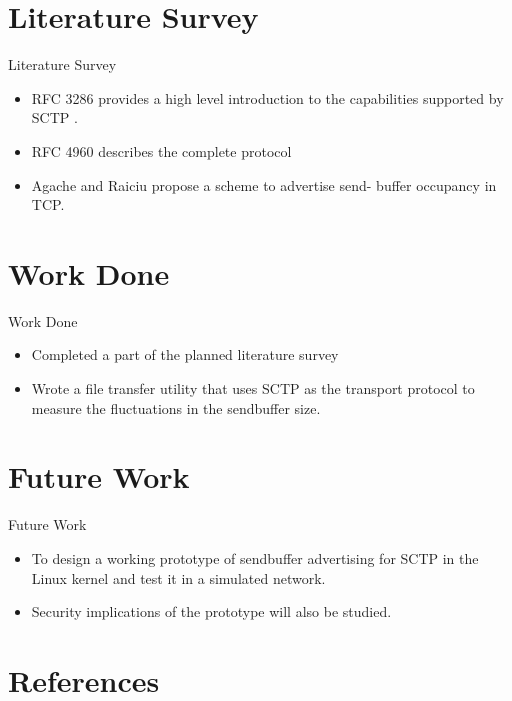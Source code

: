 \documentclass{beamer}
\begin{document}
\section{Literature Survey }
\begin{frame}{Literature Survey }
\begin{itemize}
\item RFC 3286 \cite{much} provides a high level introduction to the capabilities supported by
SCTP . 
\item RFC 4960 \cite{sumit} describes the complete protocol
\item Agache and Raiciu \cite{aga} propose a scheme to advertise send-
buffer occupancy in TCP.
\end{itemize}
\end{frame}
\section{Work Done}
\begin{frame}{Work Done}
\begin{itemize}
 \item Completed a part of the planned literature survey
 \item Wrote a file transfer utility that uses SCTP as the transport protocol to measure the fluctuations in the sendbuffer size.
\end{itemize}
\end{frame}

\section{Future Work}
\begin{frame}{Future Work}
\begin{itemize}
\item To design a working prototype of sendbuffer advertising for SCTP in the Linux
kernel and test it in a simulated network.
 \item Security implications of the prototype will also be studied.
 
\end{itemize}
\end{frame}


\section{References}
\end{document}
